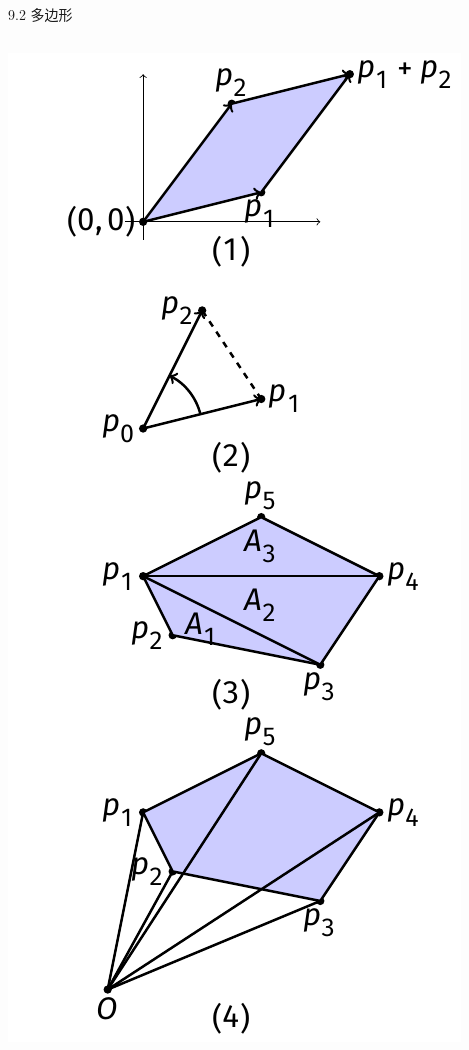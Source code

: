 \begin{frame}{9.2 多边形}
\begin{columns}
        \includegraphics[scale=.45]{fig/9-5.pdf}
    \end{columns}
\end{frame}
